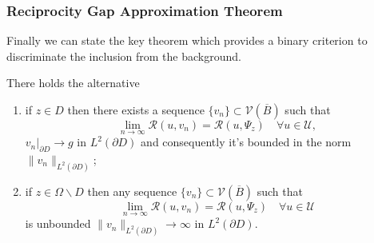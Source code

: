 \documentclass[10pt]{beamer}
\theoremstyle{plain}
\theoremstyle{plain}
\begin{document}
\begin{frame}
 \frametitle{Reciprocity Gap Approximation Theorem}
 Finally we can state the key theorem which provides a binary criterion to discriminate the inclusion from the background.
\begin{theorem}
 \label{theo:approximation-rg} 
There holds the alternative
 \begin{enumerate}
  \item if $z \in D$ then there exists a sequence $\{v_n\} \subset \mathcal{V}(\overline{B})$ such that
   \begin{equation}
     \lim_{n\to\infty}\mathcal{R}(u,v_n) = \mathcal{R}(u,\Psi_z)\quad\forall u\in\mathcal{U},\label{eq:rg-lim-constructive}
   \end{equation}
   $v_n|_{\partial D}\to g$ in $L^2(\partial D)$ and consequently  it's bounded in the norm $\|v_n\|_{L^2(\partial D)}$;
  \item if $z \in \Omega \backslash D$ then any sequence $\{v_n\} \subset \mathcal{V}(\overline{B})$ such that
   \begin{equation}
     \lim_{n\to\infty}\mathcal{R}(u,v_n) = \mathcal{R}(u,\Psi_z)\quad\forall u\in\mathcal{U}\label{eq:rg-lim-counterpart}
   \end{equation}
   is unbounded $\|v_n\|_{L^2(\partial D)}\to\infty$ in $L^2(\partial D)$.
 \end{enumerate}
\end{theorem}
\end{frame}
\end{document}
